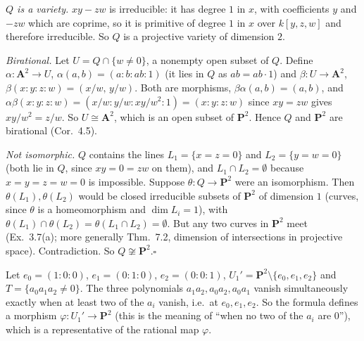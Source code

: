 \documentclass[11pt]{article}
\begin{document}
\pf
\emph{$Q$ is a variety.} $xy-zw$ is irreducible: it has degree $1$ in $x$, with coefficients $y$ and $-zw$ which are coprime, so it is primitive of degree $1$ in $x$ over $k[y,z,w]$ and therefore irreducible. So $Q$ is a projective variety of dimension $2$.

\emph{Birational.} Let $U=Q\cap\{w\ne0\}$, a nonempty open subset of $Q$. Define $\alpha:\mathbf A^2\to U$, $\alpha(a,b)=(a:b:ab:1)$ (it lies in $Q$ as $ab=ab\cdot1$) and $\beta:U\to\mathbf A^2$, $\beta(x:y:z:w)=(x/w,\,y/w)$. Both are morphisms, $\beta\alpha(a,b)=(a,b)$, and $\alpha\beta(x:y:z:w)=(x/w:y/w:xy/w^2:1)=(x:y:z:w)$ since $xy=zw$ gives $xy/w^2=z/w$. So $U\cong\mathbf A^2$, which is an open subset of $\mathbf P^2$. Hence $Q$ and $\mathbf P^2$ are birational (Cor.~4.5).

\emph{Not isomorphic.} $Q$ contains the lines $L_1=\{x=z=0\}$ and $L_2=\{y=w=0\}$ (both lie in $Q$, since $xy=0=zw$ on them), and $L_1\cap L_2=\emptyset$ because $x=y=z=w=0$ is impossible. Suppose $\theta:Q\to\mathbf P^2$ were an isomorphism. Then $\theta(L_1),\theta(L_2)$ would be closed irreducible subsets of $\mathbf P^2$ of dimension $1$ (curves, since $\theta$ is a homeomorphism and $\dim L_i=1$), with $\theta(L_1)\cap\theta(L_2)=\theta(L_1\cap L_2)=\emptyset$. But any two curves in $\mathbf P^2$ meet (Ex.~3.7(a); more generally Thm.~7.2, dimension of intersections in projective space). Contradiction. So $Q\not\cong\mathbf P^2$.\hfill$\square$

\pf
Let $e_0=(1:0:0)$, $e_1=(0:1:0)$, $e_2=(0:0:1)$, $U_1'=\mathbf P^2\setminus\{e_0,e_1,e_2\}$ and $T=\{a_0a_1a_2\neq0\}$. The three polynomials $a_1a_2,a_0a_2,a_0a_1$ vanish simultaneously exactly when at least two of the $a_i$ vanish, i.e.\ at $e_0,e_1,e_2$. So the formula defines a morphism $\varphi:U_1'\to\mathbf P^2$ (this is the meaning of ``when no two of the $a_i$ are $0$''), which is a representative of the rational map $\varphi$.
\end{document}
